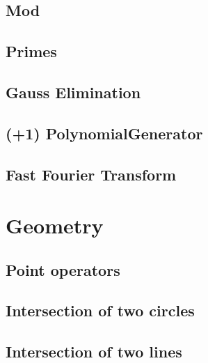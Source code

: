 \documentclass[10pt,twocolumn,oneside]{article}
\begin{document}
\subsection{Mod}


\subsection{Primes}


\subsection{Gauss Elimination}


\subsection{(+1) PolynomialGenerator}


\subsection{Fast Fourier Transform}


\section{Geometry}
\subsection{Point operators}


\subsection{Intersection of two circles}


\subsection{Intersection of two lines}


\end{document}
